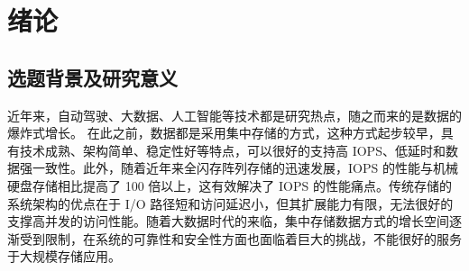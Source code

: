 
\chapter{绪论}

\section{选题背景及研究意义}

近年来，自动驾驶、大数据、人工智能等技术都是研究热点，随之而来的是数据的爆炸式增长。
在此之前，数据都是采用集中存储的方式，这种方式起步较早，具有技术成熟、架构简单、稳定性好等特点，可以很好的支持高 IOPS、低延时和数据强一致性。此外，随着近年来全闪存阵列存储的迅速发展，IOPS 的性能与机械硬盘存储相比提高了 100 倍以上，这有效解决了 IOPS 的性能痛点。传统存储的系统架构的优点在于 I/O 路径短和访问延迟小，但其扩展能力有限，无法很好的支撑高并发的访问性能。随着大数据时代的来临，集中存储数据方式的增长空间逐渐受到限制，在系统的可靠性和安全性方面也面临着巨大的挑战，不能很好的服务于大规模存储应用。




